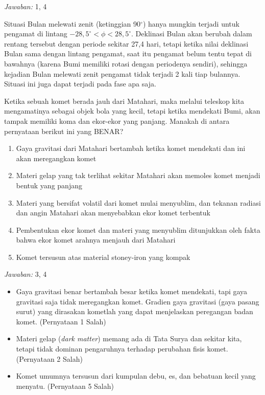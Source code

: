 \documentclass[11pt,fleqn]{exam}
\newcommand*{\de}{\ensuremath{^{\circ}}}
\begin{document}
\begin{questions}
\bigskip
\textit{Jawaban: } 1, 4

Situasi Bulan melewati zenit (ketinggian 90\de) hanya mungkin terjadi untuk pengamat di lintang $-28,5^{\circ} < \phi < 28,5^{\circ}$. Deklinasi Bulan akan berubah dalam rentang tersebut dengan periode sekitar 27,4 hari, tetapi ketika nilai deklinasi Bulan sama dengan lintang pengamat, saat itu pengamat belum tentu tepat di bawahnya (karena Bumi memiliki rotasi dengan periodenya sendiri), sehingga kejadian Bulan melewati zenit pengamat tidak terjadi 2 kali tiap bulannya. Situasi ini juga dapat terjadi pada fase apa saja. 

\vspace{0.5cm}
\question Ketika sebuah komet berada jauh dari Matahari, maka melalui teleskop kita mengamatinya sebagai objek bola yang kecil, tetapi ketika mendekati Bumi, akan tampak memiliki koma dan ekor-ekor yang panjang. Manakah di antara pernyataan berikut ini yang BENAR?
\begin{enumerate}
\item Gaya gravitasi dari Matahari bertambah ketika komet mendekati dan ini akan meregangkan komet
\item Materi gelap yang tak terlihat sekitar Matahari akan memoles komet menjadi bentuk yang panjang
\item Materi yang bersifat volatil dari komet mulai menyublim, dan tekanan radiasi dan angin Matahari akan menyebabkan ekor komet terbentuk
\item Pembentukan ekor komet dan materi yang menyublim ditunjukkan oleh fakta bahwa ekor komet arahnya menjauh dari Matahari
\item Komet tersusun atas material stoney-iron yang kompak
\end{enumerate}

\bigskip
\textit{Jawaban: } 3, 4

\begin{itemize}
    \item Gaya gravitasi benar bertambah besar ketika komet mendekati, tapi gaya gravitasi saja tidak meregangkan komet. Gradien gaya gravitasi (gaya pasang surut) yang dirasakan kometlah yang dapat menjelaskan peregangan badan komet. (Pernyataan 1 Salah)
    \item Materi gelap (\textit{dark matter}) memang ada di Tata Surya dan sekitar kita, tetapi tidak dominan pengaruhnya terhadap perubahan fisis komet. (Pernyataan 2 Salah)
    \item Komet umumnya tersusun dari kumpulan debu, es, dan bebatuan kecil yang menyatu. (Pernyataan 5 Salah)
\end{itemize}


\end{questions}
\end{document}
